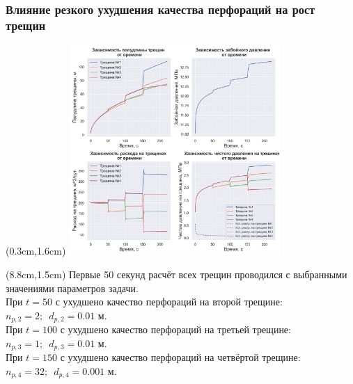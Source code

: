 \documentclass{beamer}
\begin{document}
\begin{frame}
\frametitle{Влияние резкого ухудшения качества перфораций на рост трещин}

\begin{textblock*}{8cm}(0.3cm,1.6cm)
\includegraphics[width=8cm]{experiment_example2_300dpi.jpg}
\end{textblock*}

\begin{textblock*}{4cm}(8.8cm,1.5cm)
\footnotesize
Первые 50 секунд расчёт всех трещин проводился с выбранными значениями параметров задачи.\\

При $t=50\text{ с}$ ухудшено качество перфораций на второй трещине: $n_{p,2}=2;\,\,\,d_{p,2}=0.01\text{ м}$.\\

При $t=100\text{ с}$ ухудшено качество перфораций на третьей трещине: $n_{p,3}=1;\,\,\,d_{p,3}=0.01\text{ м}$.\\

При $t=150\text{ с}$ ухудшено качество перфораций на четвёртой трещине: $n_{p,4}=32;\,\,\,d_{p,4}=0.001\text{ м}$.\\

\normalsize
\end{textblock*}

\end{frame}
\end{document}
